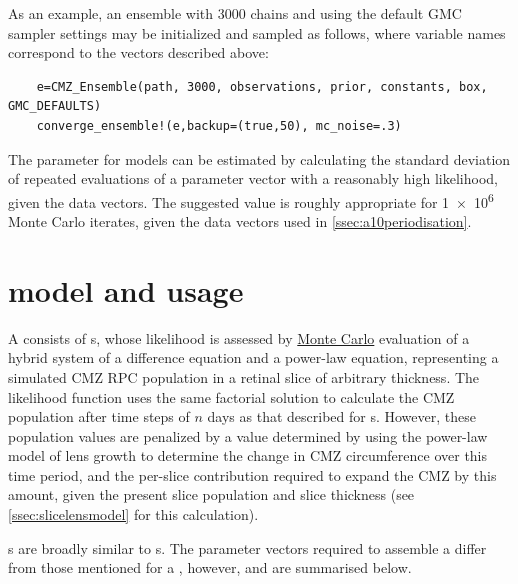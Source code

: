 \documentclass{ut-thesis}
\begin{document}
\begin{NoHyper}
As an example, an ensemble with 3000 chains and using the default GMC sampler settings may be initialized and sampled as follows, where variable names correspond to the vectors described above:

\begin{verbatim}
    e=CMZ_Ensemble(path, 3000, observations, prior, constants, box, GMC_DEFAULTS)
    converge_ensemble!(e,backup=(true,50), mc_noise=.3)
\end{verbatim}

The  parameter for  models can be estimated by calculating the standard deviation of repeated evaluations of a parameter vector with a reasonably high likelihood, given the data vectors. The suggested value is roughly appropriate for \num{1e6} Monte Carlo iterates, given the data vectors used in \autoref{ssec:a10periodisation}.

\section{\protect{} model and usage}
\label{sec:slicemodel}
A  consists of s, whose likelihood is assessed by \hyperref[ssec:MonteCarlo]{Monte Carlo} evaluation of a hybrid system of a difference equation and a power-law equation, representing a simulated CMZ RPC population in a retinal slice of arbitrary thickness. The  likelihood function uses the same factorial solution to calculate the CMZ population after time steps of $n$ days as that described for s. However, these population values are penalized by a value determined by using the power-law model of lens growth to determine the change in CMZ circumference over this time period, and the per-slice contribution required to expand the CMZ by this amount, given the present slice population and slice thickness (see \autoref{ssec:slicelensmodel} for this calculation).

s are broadly similar to s. The parameter vectors required to assemble a  differ from those mentioned for a , however, and are summarised below. 


\end{NoHyper}
\end{document}
